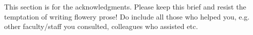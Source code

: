 \acknowledgments

This section is for the acknowledgments. Please keep this brief and resist the temptation of writing flowery prose! Do include all those who helped you, e.g. other faculty/staff you consulted, colleagues who assisted etc.






\signature{\today}


